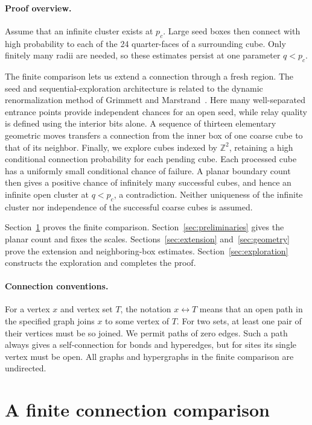 \documentclass[11pt]{article}
\theoremstyle{definition}
\theoremstyle{remark}
\numberwithin{equation}{section}
\begin{document}
\paragraph{Proof overview.}
Assume that an infinite cluster exists at $p_c$. Large seed boxes then
connect with high probability to each of the 24 quarter-faces of a surrounding
cube. Only finitely many radii are needed, so these estimates persist at one
parameter $q<p_c$.

The finite comparison lets us extend a connection through a fresh region.
The seed and sequential-exploration architecture is related to the dynamic
renormalization method of Grimmett and Marstrand~\cite[Sections~3--4]{GrimmettMarstrand1990}.
Here many well-separated entrance points provide independent chances for an
open seed, while relay quality is defined using the interior bits alone. A
sequence of thirteen elementary geometric moves transfers a connection from
the inner box of one coarse cube to that of its neighbor. Finally, we explore
cubes indexed by $\mathbb Z^2$, retaining a high conditional connection
probability for each pending cube. Each processed cube has a uniformly small
conditional chance of failure. A planar boundary count then gives a positive
chance of infinitely many successful cubes, and hence an infinite open
cluster at $q<p_c$, a contradiction. Neither uniqueness of the infinite
cluster nor independence of the successful coarse cubes is assumed.

Section~\ref{sec:comparison} proves the finite comparison.
Section~\ref{sec:preliminaries} gives the planar count and fixes the scales.
Sections~\ref{sec:extension} and~\ref{sec:geometry} prove the extension
and neighboring-box estimates. Section~\ref{sec:exploration} constructs
the exploration and completes the proof.

\paragraph{Connection conventions.}
For a vertex $x$ and vertex set $T$, the notation $x\leftrightarrow T$
means that an open path in the specified graph joins $x$ to some vertex of
$T$. For two sets, at least one pair of their vertices must be so joined.
We permit paths of zero edges. Such a path always gives a self-connection
for bonds and hyperedges, but for sites its single vertex must be open.
All graphs and hypergraphs in the finite comparison are undirected.

\section{A finite connection comparison}\label{sec:comparison}
\end{document}
